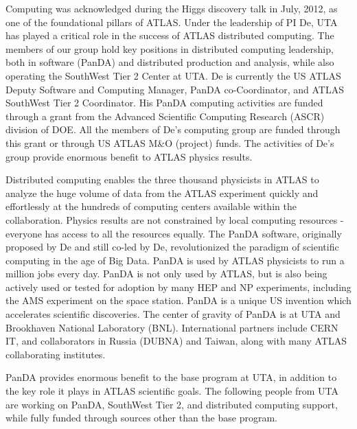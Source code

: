 
Computing was acknowledged during the Higgs discovery talk in July, 2012, as one of the foundational pillars of ATLAS. Under the leadership of PI De, UTA has played a critical role in the success of ATLAS distributed computing. The members of our group hold key positions in distributed computing leadership, both in software (PanDA) and distributed production and analysis, while also operating the SouthWest Tier 2 Center at UTA. De is currently the US ATLAS Deputy Software and Computing Manager, PanDA co-Coordinator, and ATLAS SouthWest Tier 2 Coordinator. His PanDA computing activities are funded through a grant from the Advanced Scientific Computing Research (ASCR) division of DOE. All the members of De's computing group are funded through this grant or through US ATLAS M\&O (project) funds. The activities of De's group provide enormous benefit to ATLAS physics results.

Distributed computing enables the three thousand physicists in ATLAS to analyze the huge volume of data from the ATLAS experiment quickly and effortlessly at the hundreds of computing centers available within the collaboration. Physics results are not constrained by local computing resources - everyone has access to all the resources equally. The PanDA software, originally proposed by De and still co-led by De, revolutionized the paradigm of scientific computing in the age of Big Data. PanDA is used by ATLAS physicists to run a million jobs every day. PanDA is not only used by ATLAS, but is also being actively used or tested for adoption by many HEP and NP experiments, including the AMS experiment on the space station. PanDA is a unique US invention which accelerates scientific discoveries. The center of gravity of PanDA is at UTA and Brookhaven National Laboratory (BNL). International partners include CERN IT, and collaborators in Russia (DUBNA) and Taiwan, along with many ATLAS collaborating institutes.

PanDA provides enormous benefit to the base program at UTA, in addition to the key role it plays in ATLAS scientific goals. The following people from UTA are working on PanDA, SouthWest Tier 2, and distributed computing support, while fully funded through sources other than the base program.

